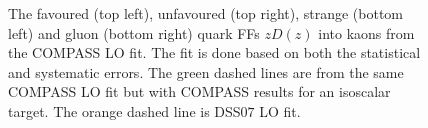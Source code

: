 \begin{figure}[!h]
	\caption{The favoured (top left), unfavoured (top right), strange (bottom left) and gluon (bottom right) quark FFs $zD(z)$ into kaons from the COMPASS LO fit. The fit is done based on both the statistical and systematic errors. The green dashed lines are from the same COMPASS LO fit but with COMPASS results for an isoscalar target. The orange dashed line is DSS$07$ LO fit.}
	\label{pic:FApp}
\end{figure}
